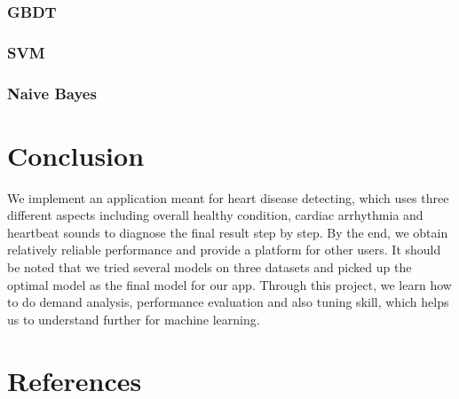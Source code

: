 \documentclass[letterpaper]{article} %
\begin{document}
\subsubsection{GBDT}

\subsubsection{SVM}

\subsubsection{Naive Bayes}

\section{Conclusion}

We implement an application meant for heart disease detecting, which uses three different aspects including overall healthy condition, cardiac arrhythmia and heartbeat sounds to diagnose the final result step by step. By the end, we obtain relatively reliable performance and provide a platform for other users. It should be noted that we tried several  models on three datasets and picked up the optimal model as the final model for our app. Through this project, we learn how to do demand analysis, performance evaluation and also tuning skill, which helps us to understand further for machine learning.

\section{References}
\end{document}
